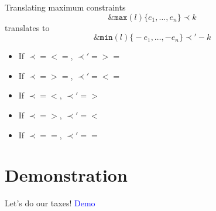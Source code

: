 \documentclass[11pt]{beamer}
\begin{document}
\begin{frame}{Translating maximum constraints}
\[\mathtt{\&max}(l)\mathtt{\{}e_1,\dots,e_n\mathtt{\}} \prec k\]
translates to
\[\mathtt{\&min}(l)\mathtt{\{}-e_1,\dots,-e_n\mathtt{\}} \prec' -k\]
 \begin{itemize}
    \item If $\prec=\mathtt{<=}$, $\prec'=\mathtt{>=}$
    \item If $\prec=\mathtt{>=}$, $\prec'=\mathtt{<=}$
    \item If $\prec=\mathtt{<}$, $\prec'=\mathtt{>}$
    \item If $\prec=\mathtt{>}$, $\prec'=\mathtt{<}$
    \item If $\prec=\mathtt{=}$, $\prec'=\mathtt{=}$
 \end{itemize}
\end{frame}

\section{Demonstration}
\begin{frame}{Let's do our taxes!}
  \huge\centering\textcolor{blue}{Demo}
\end{frame}
\end{document}

